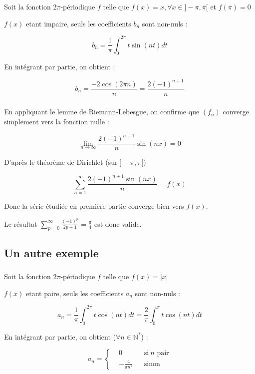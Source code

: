 \documentclass{article}
\begin{document}
\subsubsection{}

Soit la fonction $2\pi$-périodique $f$ telle que $f(x) = x, \forall x \in ]-\pi, \pi[$ et $f(\pi) = 0$

$f(x)$ etant impaire, seuls les coefficients $b_n$ sont non-nuls :

$$b_n = \frac{1}{\pi} \int_{0}^{2\pi}t \sin(n t) dt$$

En intégrant par partie, on obtient :

$$b_n = \frac{-2 \cos(2 \pi n)}{n} = \frac{2(-1)^{n+1}}{n}$$

\subsubsection{}

En appliquant le lemme de Riemann-Lebesgue, on confirme que $(f_n)$ converge simplement vers la fonction nulle :

$$\lim_{n \to \infty} \frac{2(-1)^{n+1}}{n} \sin(n x) = 0$$

D'après le théorème de Dirichlet (sur $]-\pi, \pi[$)

$$\sum_{n = 1}^{\infty} \frac{2(-1)^{n+1} \sin(n x)}{n} = f(x)$$

Donc la série étudiée en première partie converge bien vers $f(x)$.

Le résultat $\sum_{p = 0}^{\infty} \frac{(-1)^{p}}{2p + 1} = \frac{\pi}{4}$ est donc valide.

\subsection{Un autre exemple}

\subsubsection{}

Soit la fonction $2\pi$-périodique $f$ telle que $f(x) = |x|$

$f(x)$ etant paire, seuls les coefficients $a_n$ sont non-nuls :

$$a_n = \frac{1}{\pi} \int_{0}^{2\pi}t \cos(n t) dt = \frac{2}{\pi} \int_{0}^{\pi}t \cos(n t) dt$$

En intégrant par partie, on obtient ($\forall n \in \mathbb{N}^*$) : 

\begin{equation*}
    a_n = \left \{
    \begin{aligned}
      &0 && \text{si}\ n \text{ pair} \\
      &-\frac{4}{\pi n^2} && \text{sinon}
    \end{aligned} \right.
\end{equation*} 
\end{document}
